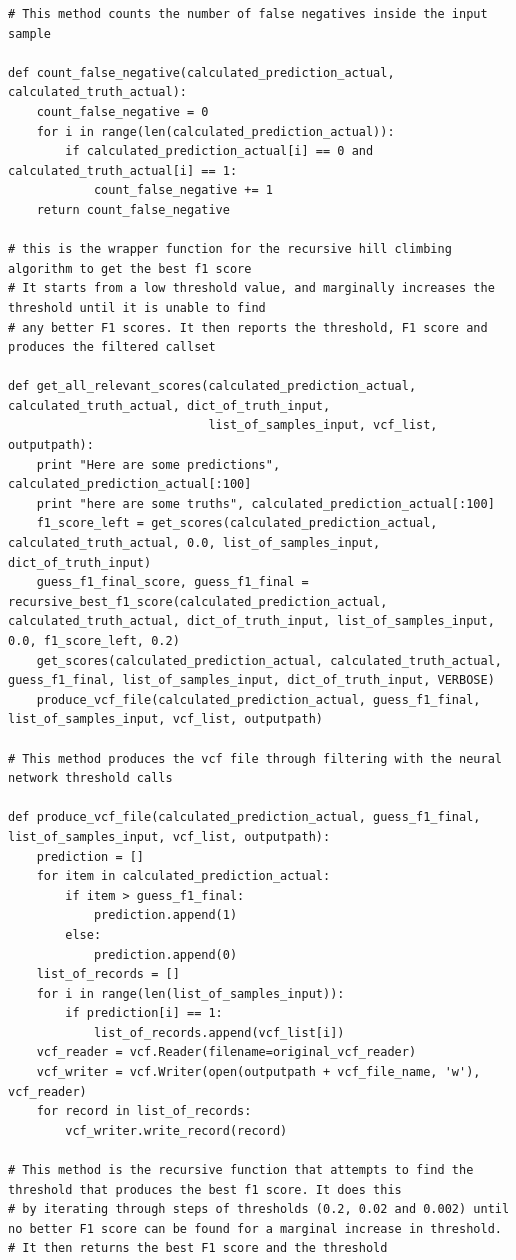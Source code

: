 \documentclass{article}
\begin{document}
\begin{verbatim}
# This method counts the number of false negatives inside the input sample

def count_false_negative(calculated_prediction_actual, calculated_truth_actual):
    count_false_negative = 0
    for i in range(len(calculated_prediction_actual)):
        if calculated_prediction_actual[i] == 0 and calculated_truth_actual[i] == 1:
            count_false_negative += 1
    return count_false_negative

# this is the wrapper function for the recursive hill climbing algorithm to get the best f1 score
# It starts from a low threshold value, and marginally increases the threshold until it is unable to find
# any better F1 scores. It then reports the threshold, F1 score and produces the filtered callset 

def get_all_relevant_scores(calculated_prediction_actual, calculated_truth_actual, dict_of_truth_input,
                            list_of_samples_input, vcf_list, outputpath):
    print "Here are some predictions", calculated_prediction_actual[:100]
    print "here are some truths", calculated_prediction_actual[:100]
    f1_score_left = get_scores(calculated_prediction_actual, calculated_truth_actual, 0.0, list_of_samples_input, dict_of_truth_input)
    guess_f1_final_score, guess_f1_final = recursive_best_f1_score(calculated_prediction_actual,   calculated_truth_actual, dict_of_truth_input, list_of_samples_input, 0.0, f1_score_left, 0.2)
    get_scores(calculated_prediction_actual, calculated_truth_actual, guess_f1_final, list_of_samples_input, dict_of_truth_input, VERBOSE)
    produce_vcf_file(calculated_prediction_actual, guess_f1_final, list_of_samples_input, vcf_list, outputpath)

# This method produces the vcf file through filtering with the neural network threshold calls

def produce_vcf_file(calculated_prediction_actual, guess_f1_final, list_of_samples_input, vcf_list, outputpath):
    prediction = []
    for item in calculated_prediction_actual:
        if item > guess_f1_final:
            prediction.append(1)
        else:
            prediction.append(0)
    list_of_records = []
    for i in range(len(list_of_samples_input)):
        if prediction[i] == 1:
            list_of_records.append(vcf_list[i])
    vcf_reader = vcf.Reader(filename=original_vcf_reader)
    vcf_writer = vcf.Writer(open(outputpath + vcf_file_name, 'w'), vcf_reader)
    for record in list_of_records:
        vcf_writer.write_record(record)

# This method is the recursive function that attempts to find the threshold that produces the best f1 score. It does this
# by iterating through steps of thresholds (0.2, 0.02 and 0.002) until no better F1 score can be found for a marginal increase in threshold. 
# It then returns the best F1 score and the threshold


\end{verbatim}
\end{document}
